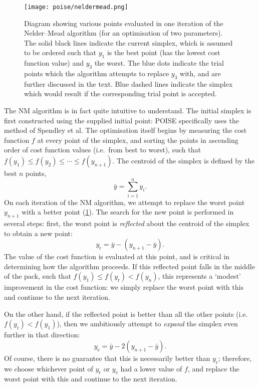 \begin{figure}[htb]
    \centering
    \texttt{[image: poise/neldermead.png]}
    \caption[Trial points in an iteration of the Nelder--Mead algorithm]{
        Diagram showing various points evaluated in one iteration of the Nelder--Mead algorithm (for an optimisation of two parameters).
        The solid black lines indicate the current simplex, which is assumed to be ordered such that $y_1$ is the best point (has the lowest cost function value) and $y_3$ the worst.
        The blue dots indicate the trial points which the algorithm attempts to replace $y_3$ with, and are further discussed in the text.
        Blue dashed lines indicate the simplex which would result if the corresponding trial point is accepted.
    }
    \label{fig:neldermead}
\end{figure}

The NM algorithm is in fact quite intuitive to understand.
The initial simplex is first constructed using the supplied initial point: POISE specifically uses the method of Spendley et al.\autocite{Spendley1962T}
The optimisation itself begins by measuring the cost function $f$ at every point of the simplex, and sorting the points in ascending order of cost function values (i.e.\ from best to worst), such that $f(y_1) \leq f(y_2) \leq \cdots \leq f(y_{n+1})$.
The centroid of the simplex is defined by the best $n$ points,
\begin{equation}
    \label{eq:simplex_centroid}
    \bar{y} = \sum_{i=1}^n y_i.
\end{equation}
On each iteration of the NM algorithm, we attempt to replace the worst point $y_{n+1}$  with a better point (\cref{fig:neldermead}).
The search for the new point is performed in several steps: first, the worst point is \textit{reflected} about the centroid of the simplex to obtain a new point:
\begin{equation}
    \label{eq:nm_reflect}
    y_\text{r} = \bar{y} - (y_{n+1} - \bar{y}).
\end{equation}
The value of the cost function is evaluated at this point, and is critical in determining how the algorithm proceeds.
If this reflected point falls in the middle of the pack, such that $f(y_1) \leq f(y_\text{r}) < f(y_n)$, this represents a `modest' improvement in the cost function: we simply replace the worst point with this and continue to the next iteration.

On the other hand, if the reflected point is better than all the other points (i.e.\ $f(y_\text{r}) < f(y_1)$), then we ambitiously attempt to \textit{expand} the simplex even further in that direction:
\begin{equation}
    \label{eq:nm_expand}
    y_\text{e} = \bar{y} - 2(y_{n+1} - \bar{y}).
\end{equation}
Of course, there is no guarantee that this is necessarily better than $y_\text{r}$; therefore, we choose whichever point of $y_\text{r}$ or $y_\text{e}$ had a lower value of $f$, and replace the worst point with this and continue to the next iteration.

